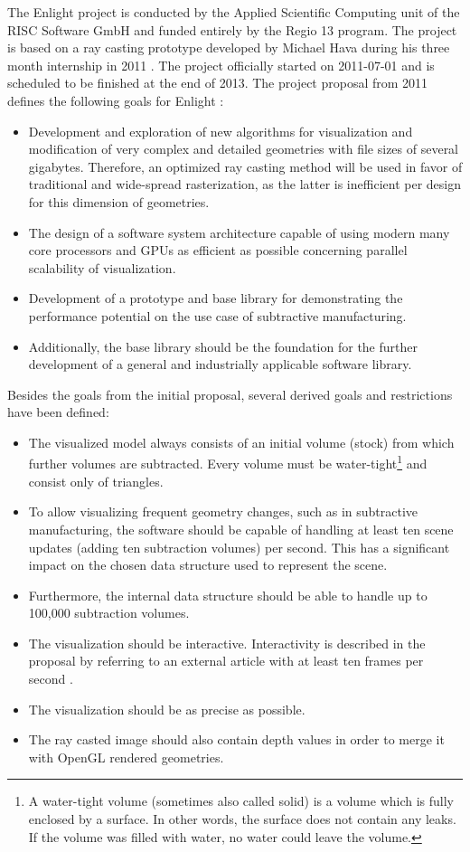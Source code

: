 The Enlight project is conducted by the Applied Scientific Computing unit of the RISC Software GmbH and funded entirely by the Regio 13 program. The project is based on a ray casting prototype developed by Michael Hava during his three month internship in 2011  \cite{bakk_michael_hava}. The project officially started on 2011-07-01 and is scheduled to be finished at the end of 2013.
The project proposal from 2011 defines the following goals for Enlight \cite{enlight_proposal} :

\begin{itemize}
	\item Development and exploration of new algorithms for visualization and modification of very complex and detailed geometries with file sizes of several gigabytes. Therefore, an optimized ray casting method will be used in favor of traditional and wide-spread rasterization, as the latter is inefficient per design for this dimension of geometries.
	\item The design of a software system architecture capable of using modern many core processors and GPUs as efficient as possible concerning parallel scalability of visualization.
	\item Development of a prototype and base library for demonstrating the performance potential on the use case of subtractive manufacturing.
	\pagebreak
	\item Additionally, the base library should be the foundation for the further development of a general and industrially applicable software library.
\end{itemize}

Besides the goals from the initial proposal, several derived goals and restrictions have been defined:

\begin{itemize}
	\item The visualized model always consists of an initial volume (stock) from which further volumes are subtracted. Every volume must be water-tight\footnote{A water-tight volume (sometimes also called solid) is a volume which is fully enclosed by a surface. In other words, the surface does not contain any leaks. If the volume was filled with water, no water could leave the volume.} and consist only of triangles.
	\item To allow visualizing frequent geometry changes, such as in subtractive manufacturing, the software should be capable of handling at least ten scene updates (adding ten subtraction volumes) per second. This has a significant impact on the chosen data structure used to represent the scene.
	\item Furthermore, the internal data structure should be able to handle up to 100,000 subtraction volumes.
	\item The visualization should be interactive. Interactivity is described in the proposal by referring to an external article with at least ten frames per second \cite{interactive_framerate}.
	\item The visualization should be as precise as possible.
	\item The ray casted image should also contain depth values in order to merge it with OpenGL rendered geometries.
\end{itemize}


